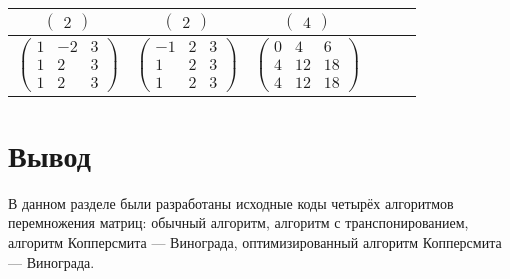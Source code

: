 \begin{table}[h!]
\begin{center}
\begin{threeparttable}
\begin{tabular}{|c|c|c|c|c|c|}
                \hline
                $\begin{pmatrix}
                     2
                \end{pmatrix}$ &
                $\begin{pmatrix}
                     2
                \end{pmatrix}$ &
                $\begin{pmatrix}
                     4
                \end{pmatrix}$ \\
                \hline
                $\begin{pmatrix}
                     1 & -2 & 3\\
                     1 & 2 & 3\\
                     1 & 2 & 3
                \end{pmatrix}$ &
                $\begin{pmatrix}
                     -1 & 2 & 3\\
                     1 & 2 & 3\\
                     1 & 2 & 3
                \end{pmatrix}$ &
                $\begin{pmatrix}
                     0 & 4 & 6\\
                     4 & 12 & 18\\
                     4 & 12 & 18
                \end{pmatrix}$\\
                \hline
            \end{tabular}
        \end{threeparttable}
    \end{center}
\end{table}

\section*{Вывод}

В данном разделе были разработаны исходные коды четырёх алгоритмов перемножения матриц: обычный алгоритм, алгоритм с транспонированием, алгоритм Копперсмита — Винограда, оптимизированный алгоритм Копперсмита — Винограда.
